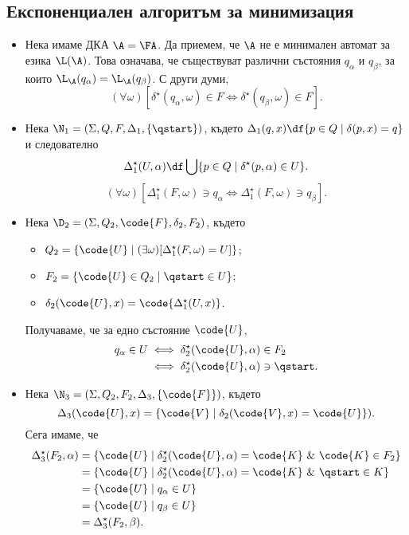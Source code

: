 \subsection{Експоненциален алгоритъм за минимизация}



\begin{itemize}
\item
  Нека имаме ДКА $\A = \FA$. Да приемем, че $\A$ не е минимален автомат за езика $\L(\A)$.
  Това означава, че съществуват различни състояния $q_\alpha$ и $q_\beta$, за които $\L_\A(q_\alpha) = \L_\A(q_\beta)$.
  С други думи,
  \begin{equation}
    \label{eq:brzozowski-minimisation:equiv-states}
    (\forall \omega)[\delta^\star(q_\alpha,\omega) \in F \iff \delta^\star(q_\beta,\omega) \in F].
  \end{equation}
\item
  Нека $\N_1 = (\Sigma, Q, F, \Delta_1, \{\qstart\})$, където
  $\Delta_1(q,x) \df \{p \in Q\mid \delta(p,x) = q\}$
  и следователно
  \[\Delta^\star_1(U,\alpha) \df \bigcup\{p \in Q\mid \delta^\star(p,\alpha) \in U\}.\]
  \begin{equation}
    \label{eq:equiv-states:rev1}
    (\forall \omega)[\Delta_1^\star(F,\omega) \ni q_\alpha \iff \Delta_1^\star(F,\omega) \ni q_\beta].
  \end{equation}
\item
  Нека $\D_2 = (\Sigma, Q_2, \code{F}, \delta_2, F_2)$, където
  \begin{itemize}
  \item
    $Q_2 = \{\code{U} \mid (\exists \omega)[\Delta^\star_1(F,\omega) = U]\}$;
  \item
    $F_2 = \{\code{U} \in Q_2 \mid \qstart \in U\}$;
  \item
    $\delta_2(\code{U},x) = \code{\Delta^\star_1(U,x)}$.
  \end{itemize}
  Получаваме, че за едно състояние $\code{U}$,
  \begin{align*}
    q_\alpha \in U & \iff \delta^\star_2(\code{U},\alpha) \in F_2\\
                   & \iff \delta^\star_2(\code{U},\alpha) \ni \qstart.
  \end{align*}
\item
  Нека $\N_3 = (\Sigma, Q_2, F_2, \Delta_3, \{\code{F}\})$, където
  \[\Delta_3(\code{U},x) = \{\code{V} \mid \delta_2(\code{V},x) = \code{U}\}).\]
  Сега имаме, че
  \begin{align*}
    \Delta^\star_3(F_2,\alpha) & = \{\code{U} \mid \delta^\star_2(\code{U},\alpha) = \code{K}\ \&\ \code{K} \in F_2\}\\
                               & = \{\code{U} \mid \delta^\star_2(\code{U},\alpha) = \code{K}\ \&\ \qstart \in K\}\\
                               & = \{\code{U} \mid q_\alpha \in U\}\\
                               & = \{\code{U} \mid q_\beta \in U\}\\
                               & = \Delta^\star_3(F_2,\beta).
  \end{align*}
\end{itemize}

